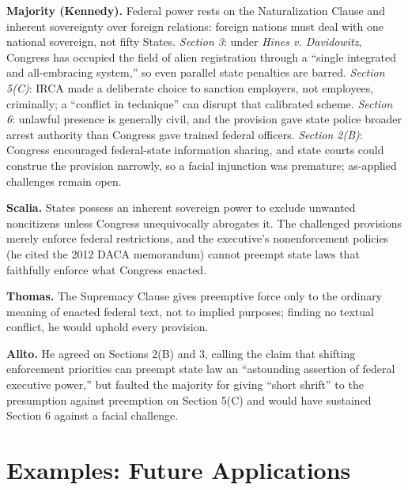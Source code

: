 \documentclass[12pt]{article}
\begin{document}
\textbf{Majority (Kennedy).} Federal power rests on the Naturalization Clause and inherent sovereignty over foreign relations: foreign nations must deal with one national sovereign, not fifty States. \emph{Section 3}: under \textit{Hines v. Davidowitz}, Congress has occupied the field of alien registration through a ``single integrated and all-embracing system,'' so even parallel state penalties are barred. \emph{Section 5(C)}: IRCA made a deliberate choice to sanction employers, not employees, criminally; a ``conflict in technique'' can disrupt that calibrated scheme. \emph{Section 6}: unlawful presence is generally civil, and the provision gave state police broader arrest authority than Congress gave trained federal officers. \emph{Section 2(B)}: Congress encouraged federal-state information sharing, and state courts could construe the provision narrowly, so a facial injunction was premature; as-applied challenges remain open.

\textbf{Scalia.} States possess an inherent sovereign power to exclude unwanted noncitizens unless Congress unequivocally abrogates it. The challenged provisions merely enforce federal restrictions, and the executive's nonenforcement policies (he cited the 2012 DACA memorandum) cannot preempt state laws that faithfully enforce what Congress enacted.

\textbf{Thomas.} The Supremacy Clause gives preemptive force only to the ordinary meaning of enacted federal text, not to implied purposes; finding no textual conflict, he would uphold every provision.

\textbf{Alito.} He agreed on Sections 2(B) and 3, calling the claim that shifting enforcement priorities can preempt state law an ``astounding assertion of federal executive power,'' but faulted the majority for giving ``short shrift'' to the presumption against preemption on Section 5(C) and would have sustained Section 6 against a facial challenge.

\section{Examples: Future Applications}
\end{document}
